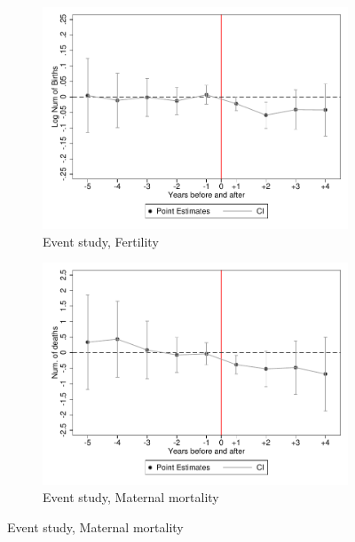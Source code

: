\documentclass[a4paper, 11pt]{article}
\begin{document}
\begin{spacing}{2}
 
\begin{figure}[H]
\centering	\caption{Placebo tests}
\label{placebo}
\begin{subfigure}{0.5\textwidth}
\centering	\caption{Event study, Fertility}	\label{placebo_birth}
\includegraphics[scale=0.55]{figures/Placeboln_birth.pdf}
\end{subfigure}%
\begin{subfigure}{0.5 \textwidth}
\centering	\caption{Event study, Maternal mortality}	\label{placebo_mmr}
\includegraphics[scale=0.55]{figures/Placebommr.pdf}  	
\end{subfigure}

\end{figure}
\end{spacing}
\end{document}
